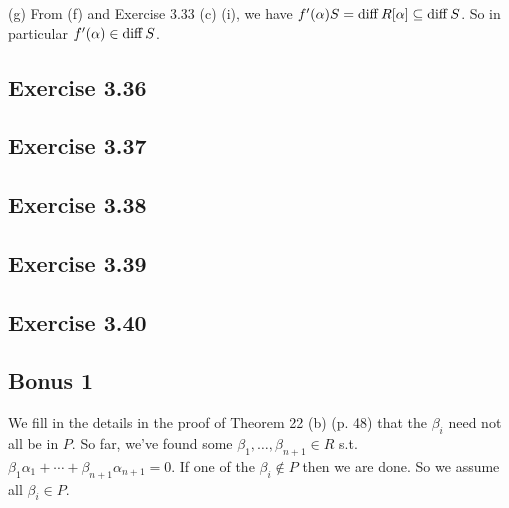 \documentclass[../Marcus.tex]{subfiles}
\begin{document}
(g) From (f) and Exercise 3.33 (c) (i), we have $f'(\alpha)S = \operatorname{diff} R[\alpha] \subseteq \operatorname{diff} S$. So in particular $f'(\alpha) \in \operatorname{diff} S$.

\subsection*{Exercise 3.36}

\begin{comment}
(a) It's sufficient to check that $\alpha_1,\ldots,\alpha_n$ are linearly independent over $K$. If not, then there exist $c_1,\ldots,c_n \in K$ not all zero s.t. $\sum c_i\alpha_i = 0$. By Exercise 2.25, we take $0 \neq m\in\ZZ$ s.t. $mc_i\in R$ for all $i$. Then $\sum mc_i\alpha_i = 0$. Since $\alpha_1,\ldots,\alpha_n$ are linearly independent mod $P$, so by considering mod $PS$ we have $mc_i \in P$ for all $i$.

Now, with the notation as in the Lemma of Theorem 22 (b) (p. 48), we set $A=P$ and $B=(mc_1,\ldots,mc_n) \neq 0$. Then there exists $\gamma\in K$ s.t. $\gamma B\subset R$ and $\gamma B\not\subset A=P$. So we have all $\gamma mc_i \in R$ but there's some $\gamma mc_{i_0} \notin P$. But by considering the equation $\sum \gamma mc_i\alpha_i = 0$ mod $PS$, we have $\gamma mc_i \in P$ for all $i$, a contradiction.
\end{comment}

\subsection*{Exercise 3.37}

\subsection*{Exercise 3.38}

\subsection*{Exercise 3.39}

\subsection*{Exercise 3.40}

\subsection*{Bonus 1}

We fill in the details in the proof of Theorem 22 (b) (p. 48) that the $\beta_i$ need not all be in $P$. So far, we've found some $\beta_1,\ldots,\beta_{n+1}\in R$ s.t. $\beta_1\alpha_1+\cdots+\beta_{n+1}\alpha_{n+1}=0$. If one of the $\beta_i\notin P$ then we are done. So we assume all $\beta_i\in P$. 
\end{document}
